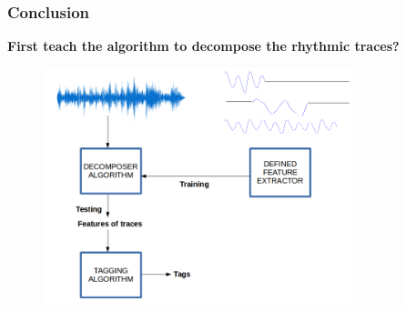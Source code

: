 \documentclass{beamer}
\begin{document}
\begin{frame}
\frametitle{Conclusion}
\textbf{First teach the algorithm to decompose the rhythmic traces?}
\begin{figure}
\includegraphics[width=0.8\textwidth]{conclusion}
\end{figure}
\end{frame}
%
%
%
\end{document}
